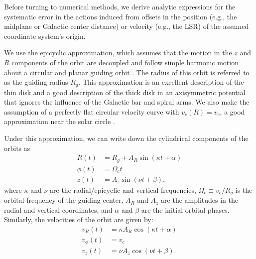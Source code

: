 \documentclass[twocolumn]{aastex62}
\newcommand{\beq}{\begin{equation}}
\newcommand{\eeq}{\end{equation}}
\begin{document}
Before turning to numerical methods, we derive analytic expressions for the
systematic error in the actions induced from offsets in the position (e.g.,
the midplane or Galactic center distance) or velocity (e.g., the LSR) of the
assumed coordinate system's origin.

We use the epicyclic approximation, which assumes that the motion in the $z$
and $R$ components of the orbit are decoupled and follow simple harmonic
motion about a circular and planar guiding orbit \citep[][Section~3.2 and
references therein]{2008gady.book.....B}. The radius of this orbit is referred
to as the guiding radius $R_g$. This approximation is an excellent description
of the thin disk and a good description of the thick disk in an axisymmetric
potential that ignores the influence of the Galactic bar and spiral arms. We
also make the assumption of a perfectly flat circular velocity curve with
$v_c(R) = v_c$, a good approximation near the solar circle
\citep[e.g.,][]{2017MNRAS.465...76M}.

Under this approximation, we can write down the cylindrical components
of the orbits as
\beq\label{eq:orbits_epi}
\begin{split}
R(t) &= R_g + A_R \sin{(\kappa t + \alpha)} \\
\phi(t) &= \Omega_c t \\
z(t) &= A_z \sin{(\nu t + \beta)}
\text{,}
\end{split}
\eeq
where $\kappa$ and $\nu$ are the radial/epicyclic and vertical frequencies, $\Omega_c
\equiv v_c/R_g$ is the orbital frequency of the guiding center, $A_R$ and
$A_z$ are the amplitudes in the radial and vertical coordinates, and $\alpha$
and $\beta$ are the initial orbital phases. Similarly, the velocities of the
orbit are given by:
\beq\label{eq:orbits_vel_epi}
\begin{split}
v_R(t) &= \kappa A_R \cos{(\kappa t + \alpha)} \\
v_{\phi}(t) &= v_c \\
v_z(t) &= \nu A_z \cos{(\nu t + \beta)}
\text{.}
\end{split}
\eeq
\end{document}
